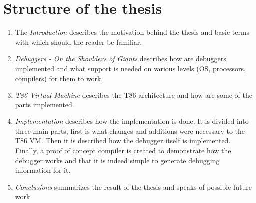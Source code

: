 \section{Structure of the thesis}
\begin{enumerate}
    \item The \textit{Introduction} describes the motivation behind the thesis and basic terms with which should the reader be familiar.
    \item \textit{Debuggers - On the Shoulders of Giants} describes how are debuggers implemented and what support is needed on various levels (OS, processors, compilers) for them to work.
    \item \textit{T86 Virtual Machine} describes the T86 architecture and how are some of the parts implemented.
    \item \textit{Implementation} describes how the implementation is done. It is divided into three main parts, first is what changes and additions were necessary to the T86 VM. Then it is described how the debugger itself is implemented. Finally, a proof of concept compiler is created to demonstrate how the debugger works and that it is indeed simple to generate debugging information for it.
    \item \textit{Conclusions} summarizes the result of the thesis and speaks of possible future work.
\end{enumerate}

